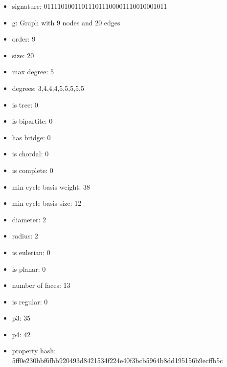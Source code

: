 \newpage
\begin{figure}
\end{figure}
\begin{itemize}
\item signature: 011110100110111011100001110010001011
\item g: Graph with 9 nodes and 20 edges
\item order: 9
\item size: 20
\item max degree: 5
\item degrees: 3,4,4,4,5,5,5,5,5
\item is tree: 0
\item is bipartite: 0
\item has bridge: 0
\item is chordal: 0
\item is complete: 0
\item min cycle basis weight: 38
\item min cycle basis size: 12
\item diameter: 2
\item radius: 2
\item is eulerian: 0
\item is planar: 0
\item number of faces: 13
\item is regular: 0
\item p3: 35
\item p4: 42
\item property hash: 5ff0e230bbf6fbb920493d8421534f224e40f3bcb5964b8dd195156b9ecffb5c
\end{itemize}
